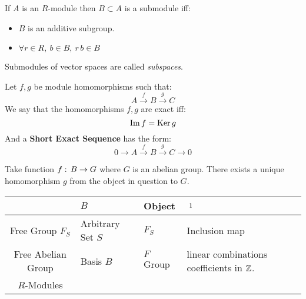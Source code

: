 \begin{ddef}[Submodules]
    If $A$ is an $R$-module then $B\subset A$ is a submodule iff:
    \begin{itemize}
        \item $B$ is an additive subgroup.
        \item $\forall r\in R,\ b\in B,\ r\,b\in B$
    \end{itemize}
    Submodules of vector spaces are called \emph{subspaces}.
\end{ddef}

\begin{ddef}
    Let $f,g$ be module homomorphisms such that:
    $$A\xrightarrow{f} B \xrightarrow{g} C$$
    We say that the homomorphisms $f,g$ are exact iff:
    $$\operatorname{Im} f = \operatorname{Ker} g$$
    And a \textbf{Short Exact Sequence} has the form:
    $$0\to A\xrightarrow{f} B \xrightarrow{g} C\to 0$$
\end{ddef}

\begin{remarks}
    Take function $f:\, B\to G$ where $G$ is an abelian group. There exists a unique homomorphism $g$ from the object in question to $G$.
    \begin{center}
        \begin{tabular}{|c|l|l|p{3cm}|}
        \hline
                            & $B$ & Object & $\imath$ \\
        \hline
    Free Group $F_S$ & Arbitrary Set $S$ & $F_S$ & Inclusion map \\
        \hline
    Free Abelian Group & Basis $B$ & $F$ Group & linear combinations coefficients in $\mathbb{Z}$. \\
        \hline
        $R$-Modules & && \\ 
            \hline
    \end{tabular}
\end{center}
\end{remarks}
